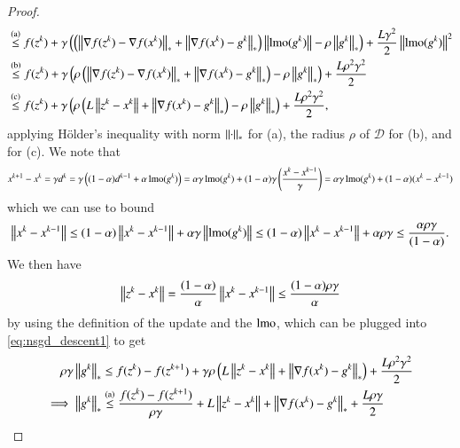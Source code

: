\begin{toappendix}
\begin{proof}
\begin{equation}
\begin{aligned}
                &\stackrel{\text{(a)}}{\leq} f(z^{k}) + \gamma\left(\left(\left\Vert{\nabla f(z^k)-\nabla f(x^k)}\right\Vert_{\ast} + \left\Vert{\nabla f(x^k) - g^k}\right\Vert_{\ast}\right)\left\Vert{\operatorname{lmo}(g^k)}\right\Vert -\rho\left\Vert{g^k}\right\Vert_{\ast}\right) +\frac{L\gamma^2}{2}\left\Vert{\operatorname{lmo}(g^k)}\right\Vert^2\\
                &\stackrel{\text{(b)}}{\leq} f(z^{k}) + \gamma\left(\rho\left(\left\Vert{\nabla f(z^k)-\nabla f(x^k)}\right\Vert_{\ast} + \left\Vert{\nabla f(x^k) - g^k}\right\Vert_{\ast}\right) -\rho\left\Vert{g^k}\right\Vert_{\ast}\right) +\frac{L\rho^2\gamma^2}{2}\\
                &\stackrel{\text{(c)}}{\leq} f(z^{k}) + \gamma\left(\rho\left(L\left\Vert{z^k-x^k}\right\Vert + \left\Vert{\nabla f(x^k) - g^k}\right\Vert_{\ast}\right) -\rho\left\Vert{g^k}\right\Vert_{\ast}\right) +\frac{L\rho^2\gamma^2}{2},
        \end{aligned}
    \end{equation}
    applying H\"{o}lder's inequality with norm $\left\Vert{\cdot}\right\Vert_{\ast}$ for (a), the radius $\rho$ of $\mathcal{D}$ for (b), and  for (c).
    We note that
    \begin{equation*}
        x^{k+1}-x^{k} = \gamma d^k = \gamma\left((1-\alpha) d^{k-1}+\alpha\operatorname{lmo}(g^k)\right) = \alpha\gamma \operatorname{lmo}(g^k) + (1-\alpha)\gamma\left(\frac{x^k-x^{k-1}}{\gamma}\right)=\alpha\gamma\operatorname{lmo}(g^k)+(1-\alpha)(x^{k}-x^{k-1})
    \end{equation*}
    which we can use to bound
    \begin{equation*}
        \left\Vert{x^{k}-x^{k-1}}\right\Vert \leq (1-\alpha)\left\Vert{x^k-x^{k-1}}\right\Vert + \alpha\gamma\left\Vert{\operatorname{lmo}(g^k)}\right\Vert \leq (1-\alpha)\left\Vert{x^k-x^{k-1}}\right\Vert + \alpha\rho\gamma \leq \frac{\alpha\rho\gamma}{(1-\alpha)}.
    \end{equation*}
    We then have
    \begin{equation*}
        \left\Vert{z^k-x^k}\right\Vert = \frac{(1-\alpha)}{\alpha}\left\Vert{x^k-x^{k-1}}\right\Vert\leq \frac{(1-\alpha)\rho\gamma}{\alpha}
    \end{equation*}
    by using the definition of the update and the $\operatorname{lmo}$, which can be plugged into \eqref{eq:nsgd_descent1} to get
    \begin{equation}
        \begin{aligned}
            \rho\gamma\norm{g^k}_{\ast}
                &\leq f(z^k) - f(z^{k+1}) + \gamma\rho\left(L\norm{z^k-x^k} + \norm{\nabla f(x^k)-g^k}_{\ast}\right) + \frac{L\rho^2\gamma^2}{2}\\
            \implies \norm{g^k}_{\ast}
                &\stackrel{\text{(a)}}{\leq} \frac{f(z^k)-f(z^{k+1})}{\rho\gamma} + L\norm{z^k-x^k} + \norm{\nabla f(x^k)-g^k}_{\ast} + \frac{L\rho\gamma}{2}\\

\end{aligned}
\end{equation}
\end{proof}
\end{toappendix}
